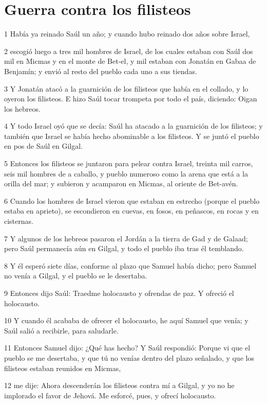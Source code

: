 \section*{Guerra contra los filisteos}

\par 1 Había ya reinado Saúl un año; y cuando hubo reinado dos años sobre Israel,
\par 2 escogió luego a tres mil hombres de Israel, de los cuales estaban con Saúl dos mil en Micmas y en el monte de Bet-el, y mil estaban con Jonatán en Gabaa de Benjamín; y envió al resto del pueblo cada uno a sus tiendas.
\par 3 Y Jonatán atacó a la guarnición de los filisteos que había en el collado, y lo oyeron los filisteos. E hizo Saúl tocar trompeta por todo el país, diciendo: Oigan los hebreos.
\par 4 Y todo Israel oyó que se decía: Saúl ha atacado a la guarnición de los filisteos; y también que Israel se había hecho abominable a los filisteos. Y se juntó el pueblo en pos de Saúl en Gilgal.
\par 5 Entonces los filisteos se juntaron para pelear contra Israel, treinta mil carros, seis mil hombres de a caballo, y pueblo numeroso como la arena que está a la orilla del mar; y subieron y acamparon en Micmas, al oriente de Bet-avén.
\par 6 Cuando los hombres de Israel vieron que estaban en estrecho (porque el pueblo estaba en aprieto), se escondieron en cuevas, en fosos, en peñascos, en rocas y en cisternas.
\par 7 Y algunos de los hebreos pasaron el Jordán a la tierra de Gad y de Galaad; pero Saúl permanecía aún en Gilgal, y todo el pueblo iba tras él temblando.
\par 8 Y él esperó siete días, conforme al plazo que Samuel había dicho; pero Samuel no venía a Gilgal, y el pueblo se le desertaba.
\par 9 Entonces dijo Saúl: Traedme holocausto y ofrendas de paz. Y ofreció el holocausto.
\par 10 Y cuando él acababa de ofrecer el holocausto, he aquí Samuel que venía; y Saúl salió a recibirle, para saludarle.
\par 11 Entonces Samuel dijo: ¿Qué has hecho? Y Saúl respondió: Porque vi que el pueblo se me desertaba, y que tú no venías dentro del plazo señalado, y que los filisteos estaban reunidos en Micmas,
\par 12 me dije: Ahora descenderán los filisteos contra mí a Gilgal, y yo no he implorado el favor de Jehová. Me esforcé, pues, y ofrecí holocausto.
